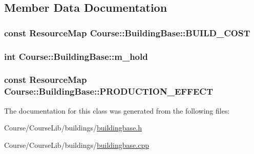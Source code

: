 \subsection{Member Data Documentation}
\hypertarget{classCourse_1_1BuildingBase_ab63e067ebb226173d7b281c70b6e58bf}{
\subsubsection[{B\-U\-I\-L\-D\-\_\-\-C\-O\-S\-T}]{\setlength{\rightskip}{0pt plus 5cm}const {\bf Resource\-Map} Course\-::\-Building\-Base\-::\-B\-U\-I\-L\-D\-\_\-\-C\-O\-S\-T}}\label{classCourse_1_1BuildingBase_ab63e067ebb226173d7b281c70b6e58bf}
\hypertarget{classCourse_1_1BuildingBase_a8945d85cabaabb7fa8bf0fa78491a15d}{
\subsubsection[{m\-\_\-hold}]{\setlength{\rightskip}{0pt plus 5cm}int Course\-::\-Building\-Base\-::m\-\_\-hold\hspace{0.3cm}{\ttfamily [private]}}}\label{classCourse_1_1BuildingBase_a8945d85cabaabb7fa8bf0fa78491a15d}
\hypertarget{classCourse_1_1BuildingBase_a69fc58a02c5299f408f35ef02a604633}{
\subsubsection[{P\-R\-O\-D\-U\-C\-T\-I\-O\-N\-\_\-\-E\-F\-F\-E\-C\-T}]{\setlength{\rightskip}{0pt plus 5cm}const {\bf Resource\-Map} Course\-::\-Building\-Base\-::\-P\-R\-O\-D\-U\-C\-T\-I\-O\-N\-\_\-\-E\-F\-F\-E\-C\-T}}\label{classCourse_1_1BuildingBase_a69fc58a02c5299f408f35ef02a604633}


The documentation for this class was generated from the following files\-:\begin{DoxyCompactItemize}
\item 
Course/\-Course\-Lib/buildings/\hyperlink{buildingbase_8h}{buildingbase.\-h}\item 
Course/\-Course\-Lib/buildings/\hyperlink{buildingbase_8cpp}{buildingbase.\-cpp}\end{DoxyCompactItemize}
